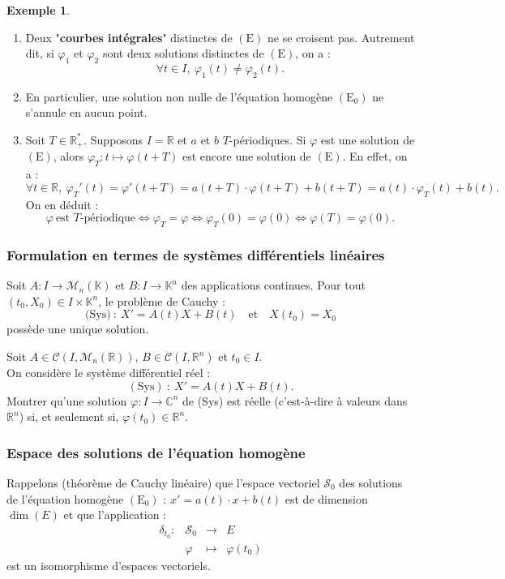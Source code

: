 \documentclass[french]{article}
\newcommand{\R}{\mathbb{R}}
\newcommand{\C}{\mathbb{C}}
\newcommand{\K}{\mathbb{K}}
\newcommand{\st}{^*}
\theoremstyle{plain}
\theoremstyle{definition}
\newtheorem*{ex}{Exemple}
\theoremstyle{remark}
\begin{document}
\begin{ex}
	\begin{enumerate}
		\item Deux "\textbf{courbes intégrales}" distinctes de $(\text{E})$ ne se croisent pas. Autrement dit, si $\varphi_1$ et $\varphi_2$ sont deux solutions distinctes de $(\text{E})$, on a :
		$$\forall t\in I,\ \varphi_1(t)\ne\varphi_2(t).$$
		\item En particulier, une solution non nulle de l'équation homogène $(\text{E}_0)$ ne s'annule en aucun point.
		\item Soit $T\in\R_+\st$. Supposons $I=\R$ et $a$ et $b$ $T$-périodiques. Si $\varphi$ est une solution de $(\text{E})$, alors $\varphi_T:t\mapsto\varphi(t+T)$ est encore une solution de $(\text{E})$. En effet, on a :
		$$\forall t\in\R,\ \varphi_T'(t)=\varphi'(t+T)=a(t+T)\cdot\varphi(t+T)+b(t+T)=a(t)\cdot\varphi_T(t)+b(t).$$
		On en déduit :
		$$\varphi\ \text{est $T$-périodique}\iff\varphi_T=\varphi\iff\varphi_T(0)=\varphi(0)\iff\varphi(T)=\varphi(0).$$
	\end{enumerate}
\end{ex}

\subsubsection*{Formulation en termes de systèmes différentiels linéaires}

Soit $A:I\to\mathcal{M}_n(\K)$ et $B:I\to\K^n$ des applications continues. Pour tout $(t_0,X_0)\in I\times\K^n$, le problème de Cauchy :
$$\text{(Sys)}\ :\ X'=A(t)X+B(t)\quad\text{et}\quad X(t_0)=X_0$$ possède une unique solution.

\begin{exo}
	Soit $A\in\mathcal{C}(I,\mathcal{M}_n(\R))$, $B\in\mathcal{C}(I,\R^n)$ et $t_0\in I$.\\
	On considère le système différentiel réel :
	$$(\text{Sys})\ :\ X'=A(t)X+B(t).$$
	Montrer qu'une solution $\varphi:I\to\C^n$ de (Sys) est réelle (c'est-à-dire à valeurs dans $\R^n$) si, et seulement si, $\varphi(t_0)\in\R^n$.
\end{exo}

\subsubsection*{Espace des solutions de l'équation homogène}

Rappelons (théorème de Cauchy linéaire) que l'espace vectoriel $\mathcal{S}_0$ des solutions de l'équation homogène $(\text{E}_0)$ : $x'=a(t)\cdot x+b(t)$ est de dimension $\dim(E)$ et que l'application :
$$\begin{array}{lrcl}
	\delta_{t_0}:&\mathcal{S}_0&\longrightarrow&E\\
	&\varphi&\longmapsto&\varphi(t_0)
\end{array}$$ est un isomorphisme d'espaces vectoriels.
\end{document}
